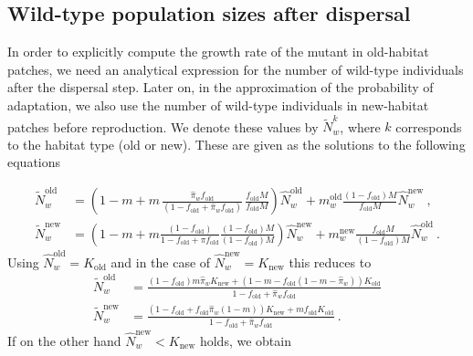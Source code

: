 \documentclass[a4paper,11pt]{scrartcl}
\begin{document}
\subsection*{Wild-type population sizes after dispersal}
In order to explicitly compute the growth rate of the mutant in old-habitat patches, we need an analytical expression for the number of wild-type individuals after the dispersal step. Later on, in the approximation of the probability of adaptation, we also use the number of wild-type individuals in new-habitat patches before reproduction. We denote these values by $\widetilde{N}_w^k$, where $k$ corresponds to the habitat type (old or new). These are given as the solutions to the following equations

\begin{equation}
	\begin{aligned}
		\widetilde{N}_w^{\text{old}} &= \left(1-m + m\, \frac{\widehat{\pi}_w f_{\text{old}}}{(1-f_{\text{old}}+\widehat{\pi}_w f_{\text{old}})}\,  \frac{f_{\text{old}}M}{f_{\text{old}}M} \right) \widehat{N}_w^{\text{old}} + m_w^{\text{old}} \frac{(1-f_{\text{old}})M}{f_{\text{old}}M}\widehat{N}_w^{\text{new}}\ , \\
		\widetilde{N}_w^{\text{new}} &= \left(1-m + m\frac{(1-f_{\text{old}})}{1-f_{\text{old}}+\pi f_{\text{old}}} \frac{(1-f_{\text{old}})M}{(1-f_{\text{old}})M}\right)\widehat{N}_w^{\text{new}} + m_w^{\text{new}} \frac{f_{\text{old}} M}{(1-f_{\text{old}})M} \widehat{N}_w^{\text{old}}\ .
	\end{aligned}
\end{equation}
Using $\widehat{N}_w^{\text{old}}=K_{\text{old}}$ and in the case of $\widehat{N}_w^{\text{new}} = K_{\text{new}}$ this reduces to
\begin{equation}\label{Seq:wt_eq1}
	\begin{aligned}
		\widetilde{N}_w^{\text{old}} &= \frac{(1-f_{\text{old}})m\widehat{\pi}_w K_{\text{new}} + (1-m-f_{\text{old}}(1-m-\widehat{\pi}_w))K_{\text{old}}}{1-f_{\text{old}}+\widehat{\pi}_w f_{\text{old}}} \\ 
		\widetilde{N}_w^{\text{new}}&= \frac{(1-f_{\text{old}}+f_{\text{old}}\widehat{\pi}_w (1-m))K_{\text{new}} + m f_{\text{old}} K_{\text{old}}}{1-f_{\text{old}}+\widehat{\pi}_w f_{\text{old}}}\ .
	\end{aligned}
\end{equation}
%
If on the other hand $\widehat{N}_w^{\text{new}}<K_{\text{new}}$ holds, we obtain
\end{document}
